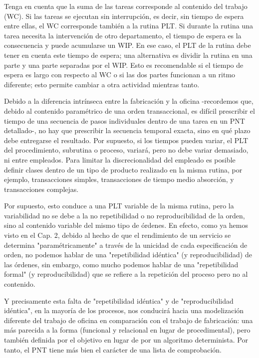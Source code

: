 Tenga en cuenta que la suma de las tareas corresponde al contenido del trabajo (WC).
Si las tareas se ejecutan sin interrupción, es decir, sin tiempo de espera entre ellas, el WC corresponde también a la rutina PLT.
Si durante la rutina una tarea necesita la intervención de otro departamento, el tiempo de espera es la consecuencia y puede acumularse un WIP.
En ese caso, el PLT de la rutina debe tener en cuenta este tiempo de espera; una alternativa es dividir la rutina en una parte y una parte separadas por el WIP.
Esto es recomendable si el tiempo de espera es largo con respecto al WC o si las dos partes funcionan a un ritmo diferente; esto permite cambiar a otra actividad mientras tanto.

Debido a la diferencia intrínseca entre la fabricación y la oficina -recordemos que, debido al contenido paramétrico de una orden transaccional, es difícil prescribir el tiempo de una secuencia de pasos individuales dentro de una tarea en un PNT detallado-, no hay que prescribir la secuencia temporal exacta, sino en qué plazo debe entregarse el resultado.
Por supuesto, si los tiempos pueden variar, el PLT del procedimiento, subrutina o proceso, variará, pero no debe variar demasiado, ni entre empleados.
Para limitar la discrecionalidad del empleado es posible definir clases dentro de un tipo de producto realizado en la misma rutina, por ejemplo, transacciones simples, transacciones de tiempo medio absorción, y transacciones complejas.

Por supuesto, esto conduce a una PLT variable de la misma rutina, pero la variabilidad no se debe a la no repetibilidad o no reproducibilidad de la orden, sino al contenido variable del mismo tipo de órdenes. En efecto, como ya hemos visto en el Cap. 2, debido al hecho de que el rendimiento de un servicio se determina "paramétricamente" a través de la unicidad de cada especificación de orden, no podemos hablar de una "repetibilidad idéntica" (y reproducibilidad) de las órdenes, sin embargo, como mucho podemos hablar de una "repetibilidad formal" (y reproducibilidad) que se refiere a la repetición del proceso pero no al contenido.

Y precisamente esta falta de "repetibilidad idéntica" y de "reproducibilidad idéntica", en la mayoría de los procesos, nos conducirá hacia una modelización diferente del trabajo de oficina en comparación con el trabajo de fabricación: una más parecida a la forma (funcional y relacional en lugar de procedimental), pero también definida por el objetivo en lugar de por un algoritmo determinista.
Por tanto, el PNT tiene más bien el carácter de una lista de comprobación.

